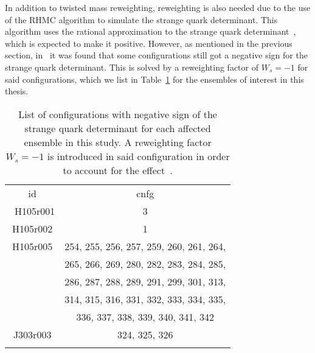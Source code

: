 In addition to twisted mass reweighting, reweighting is also needed due to the use of the RHMC algorithm to simulate the strange quark determinant. This algorithm uses the rational approximation to the strange quark determinant~\citep{RHMC}, which is expected to make it positive. However, as mentioned in the previous section, in~\citep{Mohler:2020txx} it was found that some configurations still got a negative sign for the strange quark determinant. This is solved by a reweighting factor of $W_s=-1$ for said configurations, which we list in Table~\ref{tab:Ws} for the ensembles of interest in this thesis.

\begin{longtable}{c | c}
\toprule
id & cnfg \\
\
H105r001 & 3 \\
H105r002 & 1 \\
H105r005 & 254, 255, 256, 257, 259, 260, 261, 264, \\
         & 265, 266, 269, 280, 282, 283, 284, 285, \\
         & 286, 287, 288, 289, 291, 299, 301, 313,\\
         & 314, 315, 316, 331, 332, 333, 334, 335, \\
         & 336, 337, 338, 339, 340, 341, 342  \\
J303r003 & 324, 325, 326 \\
\bottomrule
\caption{List of configurations with negative sign of the strange quark determinant for each affected ensemble in this study. A reweighting factor $W_s=-1$ is introduced in said configuration in order to account for the effect~\citep{Mohler:2020txx}.}
\label{tab:Ws}
\end{longtable}


